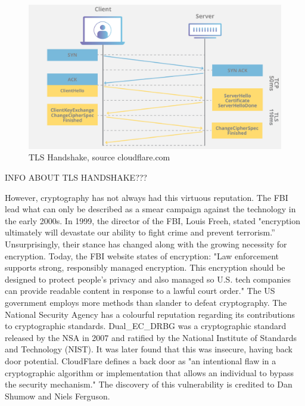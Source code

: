 \begin{figure}
  \centering
  \includegraphics[width=\textwidth]{Circumvention Tools/TLS_Handshake.png}
  \caption{TLS Handshake, source cloudflare.com}
  \label{fig:your_label_here}
\end{figure}


INFO ABOUT TLS HANDSHAKE???

However, cryptography has not always had this virtuous reputation. The FBI lead what can only be described as a smear campaign against the technology in the early 2000s. In 1999, the director of the FBI, Louis Freeh, stated "encryption ultimately will devastate our ability to fight crime and prevent terrorism.” \cite{bitsbook_chapter5} Unsurprisingly, their stance has changed along with the growing necessity for encryption. Today, the FBI website states of encryption: "Law enforcement supports strong, responsibly managed encryption. This encryption should be designed to protect people’s privacy and also managed so U.S. tech companies can provide readable content in response to a lawful court order." \cite{fbi_lawful_access} The US government employs more methods than slander to defeat cryptography. The National Security Agency \cite{nsa_website} has a colourful reputation regarding its contributions to cryptographic standards. Dual\_EC\_DRBG was a cryptographic standard released by the NSA in 2007 and ratified by the National Institute of Standards and Technology (NIST). It was later found that this was insecure, having back door potential. CloudFlare defines a back door as "an intentional flaw in a cryptographic algorithm or implementation that allows an individual to bypass the security mechanism." \cite{cloudflare_nsa_backdoor} The discovery of this vulnerability is credited to Dan Shumow and Niels Ferguson. \cite{schneier_nsa_backdoor}



